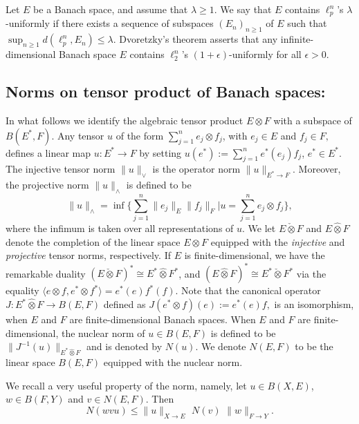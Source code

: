\documentclass[a4paper,oneside,11pt, reqno]{amsart}
\numberwithin{equation}{section}
\theoremstyle{plain}
\begin{document}
Let $E$ be a Banach space, and assume that $\lambda\geqslant 1$. We say that $E$ contains $\ell_p^n$'s $\lambda$-uniformly if there exists a sequence of subspaces $(E_n)_{n\geqslant 1}$ of $E$ such that $\sup_{n\geqslant 1} d(\ell_p^n, E_{n})\leqslant \lambda$.
Dvoretzky's theorem asserts that any infinite-dimensional Banach space $E$ contains $\ell_2^n$'s $(1+\epsilon)$-uniformly for all $\epsilon >0$.

\subsection{Norms on tensor product of Banach spaces:} In what follows we identify the algebraic tensor product $E\otimes F$ with a subspace of $B(E^*,F)$. Any tensor $u$ of the form $\sum_{j=1}^n e_j\otimes f_j$, with $e_j\in E$ and $f_j\in F,$ defines a linear map $u:E^* \to F$ by setting $u(e^*) := \sum_{j=1}^n e^*(e_j) f_j$, $e^*\in E^*$. 
The injective tensor norm $\|u\|_\vee$ is the operator norm $\|u\|_{E^* \to F}$. Moreover, the projective norm $\|u\|_\wedge$ is defined to be 
\[\|u\|_\wedge=\inf \Big \{ \sum_{j=1}^n \|e_j\|_E \|f_j\|_F \big| u = \sum_{j=1}^n e_j \otimes f_j \Big \},\] 
where the infimum is taken over all representations of $u.$
We let $E\check{\otimes}F$ and $E\hat{\otimes}F$ denote the completion of the linear space $E\otimes F$ equipped with the {\it injective} and {\it projective} tensor norms, respectively. If $E$ is finite-dimensional, we have the remarkable duality $(E\check{\otimes}F)^*\cong E^*\hat{\otimes}F^*$, and $(E\hat{\otimes}F)^*\cong E^*\check{\otimes}F^*$ via  the equality $\langle e\otimes f,e^*\otimes f^*\rangle=e^*(e)f^*(f).$
Note that the canonical operator $J:E^*\hat{\otimes}F\to B(E,F)$ defined as $J(e^*\otimes f)(e):=e^*(e)f,$ is an isomorphism, when $E$ and $F$ are finite-dimensional Banach spaces. When $E$ and $F$ are finite-dimensional, the nuclear norm of $u\in B(E,F)$ is defined to be $\|J^{-1}(u)\|_{E^*\hat{\otimes}F}$ and is denoted by $N(u)$. We denote $N(E,F)$ to be the linear space $B(E,F)$ equipped with the nuclear norm. 

We recall a very useful property of the norm, namely, let $u\in B(X,E)$, $w\in B(F,Y)$ and $v\in N(E,F)$. Then  
\[N(wvu) \leqslant \|u\|_{X\to E}\,\, N(v)\,\,\|w\|_{F\to Y}.\]
\end{document}
